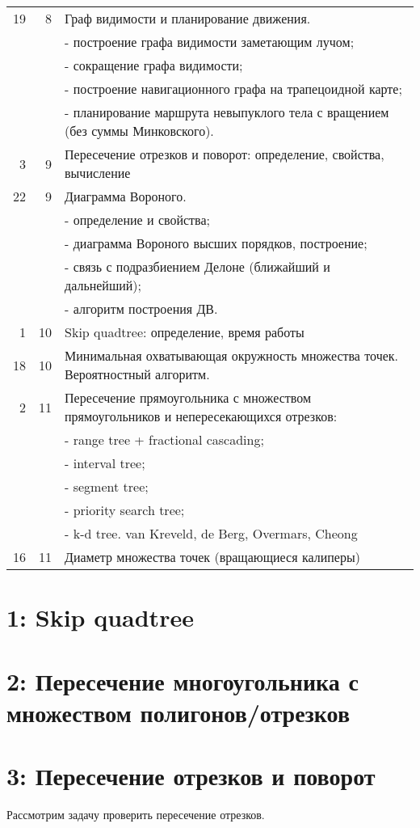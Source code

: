 \documentclass[11pt]{article}
\begin{document}
\begin{center}
\begin{tabular}{rrl}
19 & 8 & Граф видимости и планирование движения.\\
 &  & - построение графа видимости заметающим лучом;\\
 &  & - сокращение графа видимости;\\
 &  & - построение навигационного графа на трапецоидной карте;\\
 &  & - планирование маршрута невыпуклого тела с вращением (без суммы Минковского).\\
3 & 9 & Пересечение отрезков и поворот: определение, свойства, вычисление\\
22 & 9 & Диаграмма Вороного.\\
 &  & - определение и свойства;\\
 &  & - диаграмма Вороного высших порядков, построение;\\
 &  & - связь с подразбиением Делоне (ближайший и дальнейший);\\
 &  & - алгоритм построения ДВ.\\
1 & 10 & Skip quadtree: определение, время работы\\
18 & 10 & Минимальная охватывающая окружность множества точек. Вероятностный алгоритм.\\
2 & 11 & Пересечение прямоугольника с множеством прямоугольников и непересекающихся отрезков:\\
 &  & - range tree + fractional cascading;\\
 &  & - interval tree;\\
 &  & - segment tree;\\
 &  & - priority search tree;\\
 &  & - k-d tree.        van Kreveld, de Berg, Overmars, Cheong\\
16 & 11 & Диаметр множества точек (вращающиеся калиперы)\\
\hline
\end{tabular}
\end{center}
\section{{\bfseries{}} 1:  Skip quadtree}
\label{sec-2}
\section{{\bfseries{}} 2:  Пересечение многоугольника с множеством полигонов/отрезков}
\label{sec-3}
\section{{\bfseries{}} 3:  Пересечение отрезков и поворот}
\label{sec-4}
Рассмотрим задачу проверить пересечение отрезков.
\end{document}
